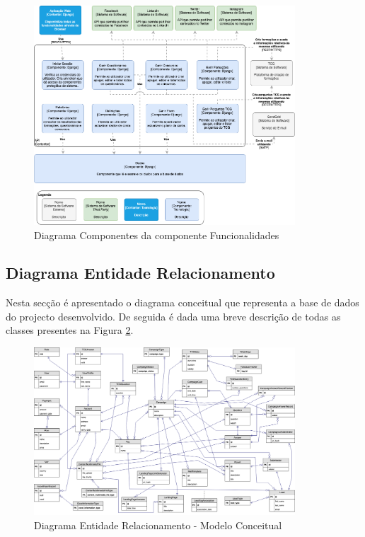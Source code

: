 \begin{figure}[ht!]
	\begin{center}
		\includegraphics[width=0.87\textwidth]{img/arq/diagrama-componentes1}
		\caption{Diagrama Componentes da componente Funcionalidades}
		\label{fig:arq-componentes1}
	\end{center}
\end{figure}

\newpage


\subsection{Diagrama Entidade Relacionamento}

Nesta secção é apresentado o diagrama conceitual que representa a base de dados do projecto desenvolvido. De seguida é dada uma breve descrição de todas as classes presentes na Figura \ref{fig:arq-er}. 

\begin{figure}[ht!]
	\begin{center}
		\includegraphics[width=0.87\textwidth]{img/arq/er}
		\caption{Diagrama Entidade Relacionamento - Modelo Conceitual}
		\label{fig:arq-er}
	\end{center}
\end{figure}

